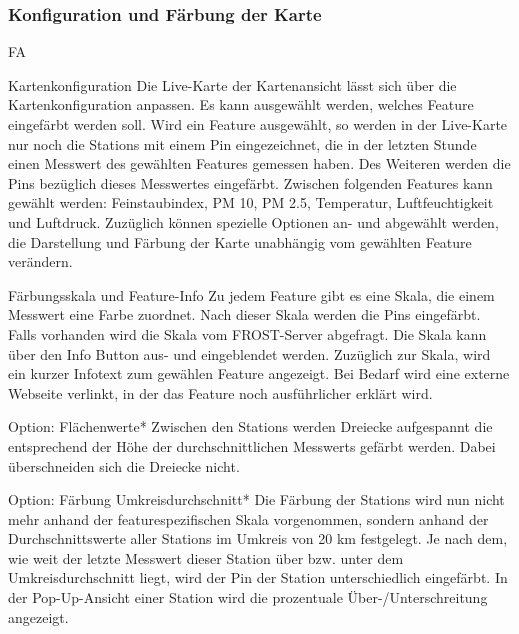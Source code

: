 \subsubsection*{Konfiguration und Färbung der Karte}
\begin{Kriterien}{FA}
  \item[Kartenkonfiguration]
    Die \gls{Live-Karte} der \gls{Kartenansicht} lässt sich über die Kartenkonfiguration anpassen. Es kann ausgewählt werden, welches 
    \gls{Feature} eingefärbt werden soll. Wird ein Feature ausgewählt, so werden in der \gls{Live-Karte} nur noch die \glspl{Station} 
    mit einem \gls{Pin} eingezeichnet, die in der letzten Stunde einen \gls{Messwert} des gewählten \glspl{Feature} gemessen 
    haben. Des Weiteren werden die \glspl{Pin} bezüglich dieses Messwertes eingefärbt. Zwischen folgenden \glspl{Feature} 
    kann gewählt werden: Feinstaubindex, PM 10, PM 2.5, Temperatur, Luftfeuchtigkeit und Luftdruck.
    Zuzüglich können spezielle Optionen an- und abgewählt werden, die Darstellung und Färbung der Karte unabhängig vom gewählten 
    Feature verändern.
    
  \item[Färbungsskala und Feature-Info]
    Zu jedem Feature gibt es eine Skala, die einem \gls{Messwert} eine Farbe zuordnet. Nach dieser Skala werden die 
    \glspl{Pin} eingefärbt. Falls vorhanden wird die Skala vom \gls{FROST-Server} abgefragt. Die Skala kann über den Info 
    Button aus- und eingeblendet werden. Zuzüglich zur Skala, wird ein kurzer Infotext zum gewählen Feature angezeigt. Bei 
    Bedarf wird eine externe Webseite verlinkt, in der das Feature noch ausführlicher erklärt wird.

  \item[Option: Flächenwerte*]
    Zwischen den \glspl{Station} werden Dreiecke aufgespannt die entsprechend der Höhe der durchschnittlichen \glspl{Messwert} 
    gefärbt werden. Dabei überschneiden sich die Dreiecke nicht.

  \item[Option: Färbung Umkreisdurchschnitt*]
    Die Färbung der \glspl{Station} wird nun nicht mehr anhand der featurespezifischen Skala vorgenommen, sondern anhand der 
    Durchschnittswerte aller \glspl{Station} im Umkreis von 20 km festgelegt. Je nach dem, wie weit der letzte \gls{Messwert} 
    dieser Station über bzw. unter dem Umkreisdurchschnitt liegt, wird der \gls{Pin} der \gls{Station} unterschiedlich eingefärbt.
    In der Pop-Up-Ansicht einer \gls{Station} wird die prozentuale Über-/Unterschreitung angezeigt.
\end{Kriterien}


